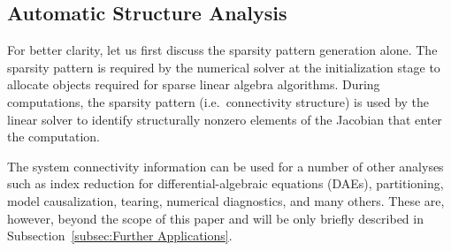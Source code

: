 \documentclass[10pt]{ijnam}
\theoremstyle{definition}
\begin{document}
\subsection{Automatic Structure Analysis}

For better clarity, let us first discuss the sparsity pattern generation alone. The sparsity pattern is required by the numerical solver at the initialization stage to allocate objects required for sparse linear algebra algorithms. During computations, the sparsity pattern (i.e.\ connectivity structure) is used by the linear solver to identify structurally nonzero elements of the Jacobian that enter the computation.

The system connectivity information can be used for a number of other analyses such as index reduction for differential-algebraic equations (DAEs), partitioning, model causalization, tearing, numerical diagnostics, and many others. These are, however, beyond the scope of this paper and will be only briefly described in Subsection~\ref{subsec:Further Applications}.
\end{document}
